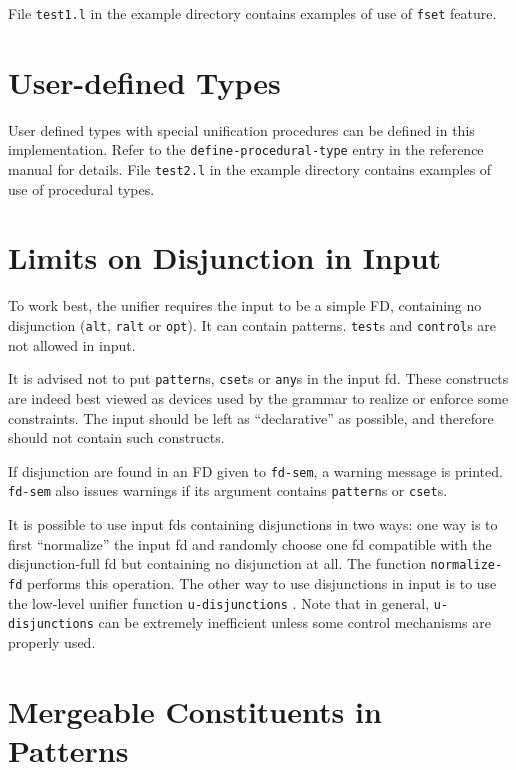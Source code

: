 \documentclass[10pt,a4paper]{report}
\begin{document}
\begin{appendices}
File {\tt test1.l}  in the example directory contains examples of use of
{\tt fset} feature.


\section{User-defined Types}
User defined types with special unification procedures can be defined in
this implementation.  Refer to the {\tt define-procedural-type} entry in the
reference manual for details.  File {\tt test2.l} in the example directory
contains examples of use of procedural types.



\section{Limits on Disjunction in Input}
To work best, the unifier requires the input to be a simple FD, containing
no disjunction ({\tt alt}, {\tt ralt} or {\tt opt}). It can contain patterns.
{\tt test}s and {\tt control}s are not allowed in input.

It is advised not to put {\tt pattern}s, {\tt cset}s or {\tt any}s in the input fd.
These constructs are indeed best viewed as devices used by the
grammar to realize or enforce some constraints. The input should
be left as ``declarative'' as possible, and therefore should not
contain such constructs.

If disjunction are found in an FD given to {\tt fd-sem}, a warning
message is printed. {\tt fd-sem} also issues warnings if its argument
contains {\tt pattern}s or {\tt cset}s.

It is possible to use input fds containing disjunctions in two ways: one
way is to first ``normalize'' the input fd and randomly choose one fd
compatible with the disjunction-full fd but containing no disjunction at
all.  The function {\tt normalize-fd} 
performs this operation.  The other way to use disjunctions in input is to
use the low-level unifier function {\tt u-disjunctions} .  Note that in general, {\tt u-disjunctions} can be extremely
inefficient unless some control mechanisms are properly used.


\section{Mergeable Constituents in Patterns}


\end{appendices}
\end{document}
